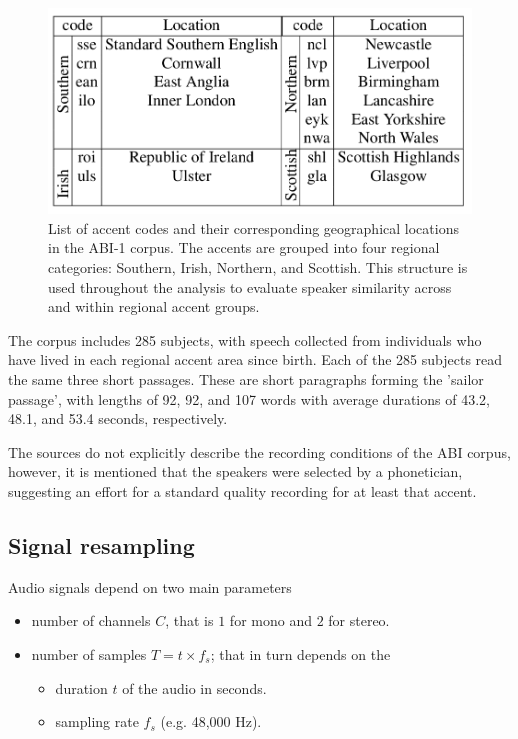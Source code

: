 \documentclass[conference]{IEEEtran}
\begin{document}
\begin{figure}[H]
	\centering
	\includegraphics[width=0.7\linewidth]{img/img-abi-corpus-accents}
	\caption{List of accent codes and their corresponding geographical locations in the ABI-1 corpus\cite{najafian2016improving}. The accents are grouped into four regional categories: Southern, Irish, Northern, and Scottish. This structure is used throughout the analysis to evaluate speaker similarity across and within regional accent groups.}
	\label{fig:img-abi-corpus-accents}
\end{figure}

The corpus includes 285 subjects, with speech collected from individuals who have lived in each regional accent area since birth. Each of the 285 subjects read the same three short passages. These are short paragraphs forming the 'sailor passage', with lengths of 92, 92, and 107 words with average durations of 43.2, 48.1, and 53.4 seconds, respectively\cite{najafian2016improving}.

The sources do not explicitly describe the recording conditions of the ABI corpus, however, it is mentioned that the speakers were selected by a phonetician, suggesting an effort for a standard quality recording for at least that accent\cite{najafian2016improving}.

\subsection{Signal resampling}
\label{ssec:signal-resampling}

Audio signals depend on two main parameters

\begin{itemize}
	\item number of channels $C$, that is $1$ for mono and $2$ for stereo.
	\item number of samples $T = t \times f_s$; that in turn depends on the
	\begin{itemize}
		\item duration $t$ of the audio in seconds.
		\item sampling rate $f_s$ (e.g. 48,000 Hz).
	\end{itemize}
	
\end{itemize}
\end{document}
